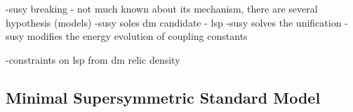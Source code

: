 
-susy breaking - not much known about its mechanism, there are several hypothesis (models)
-susy soles dm candidate - lsp
-susy solves the unification - susy modifies the energy evolution of coupling constants 

-constraints on lsp from dm relic density~\cite{Ade:2015xua}

\subsection{Minimal Supersymmetric Standard Model}

